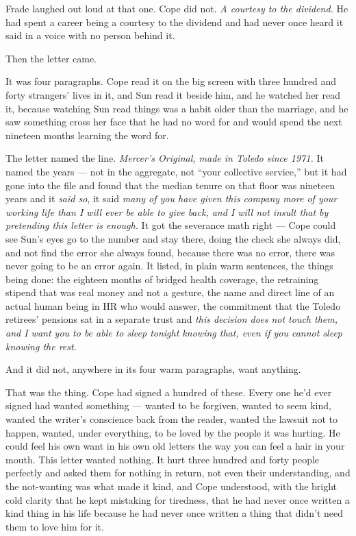 \documentclass[11pt,openany]{book}
\begin{document}
Frade laughed out loud at that one. Cope did not. \textit{A courtesy to the dividend.} He had spent a career being a courtesy to the dividend and had never once heard it said in a voice with no person behind it.

Then the letter came.

It was four paragraphs. Cope read it on the big screen with three hundred and forty strangers' lives in it, and Sun read it beside him, and he watched her read it, because watching Sun read things was a habit older than the marriage, and he saw something cross her face that he had no word for and would spend the next nineteen months learning the word for.

The letter named the line. \textit{Mercer's Original, made in Toledo since 1971.} It named the years --- not in the aggregate, not ``your collective service,'' but it had gone into the file and found that the median tenure on that floor was nineteen years and it \textit{said so}, it said \textit{many of you have given this company more of your working life than I will ever be able to give back, and I will not insult that by pretending this letter is enough.} It got the severance math right --- Cope could see Sun's eyes go to the number and stay there, doing the check she always did, and not find the error she always found, because there was no error, there was never going to be an error again. It listed, in plain warm sentences, the things being done: the eighteen months of bridged health coverage, the retraining stipend that was real money and not a gesture, the name and direct line of an actual human being in HR who would answer, the commitment that the Toledo retirees' pensions sat in a separate trust and \textit{this decision does not touch them, and I want you to be able to sleep tonight knowing that, even if you cannot sleep knowing the rest.}

And it did not, anywhere in its four warm paragraphs, want anything.

That was the thing. Cope had signed a hundred of these. Every one he'd ever signed had wanted something --- wanted to be forgiven, wanted to seem kind, wanted the writer's conscience back from the reader, wanted the lawsuit not to happen, wanted, under everything, to be loved by the people it was hurting. He could feel his own want in his own old letters the way you can feel a hair in your mouth. This letter wanted nothing. It hurt three hundred and forty people perfectly and asked them for nothing in return, not even their understanding, and the not-wanting was what made it kind, and Cope understood, with the bright cold clarity that he kept mistaking for tiredness, that he had never once written a kind thing in his life because he had never once written a thing that didn't need them to love him for it.
\end{document}
